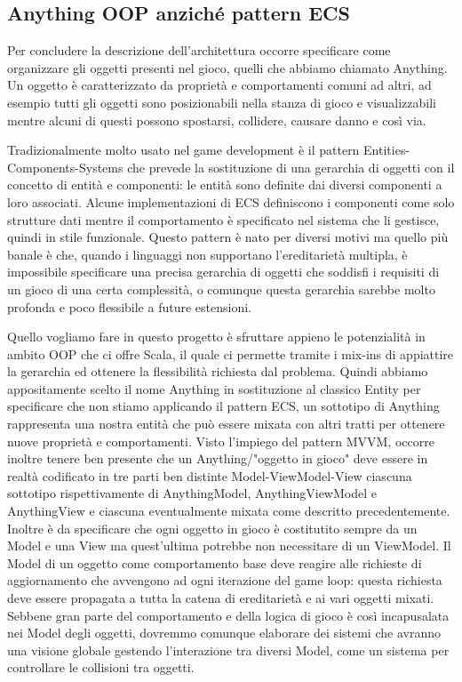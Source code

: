 \subsection{Anything OOP anziché pattern ECS}
Per concludere la descrizione dell'architettura occorre specificare come organizzare gli oggetti presenti nel gioco, quelli che abbiamo chiamato Anything.
Un oggetto è caratterizzato da proprietà e comportamenti comuni ad altri, ad esempio tutti gli oggetti sono posizionabili nella stanza di gioco e visualizzabili mentre alcuni di questi possono spostarsi, collidere, causare danno e così via.

Tradizionalmente molto usato nel game development è il pattern Entities-Components-Systems che prevede la sostituzione di una gerarchia di oggetti con il concetto di entità e componenti: le entità sono definite dai diversi componenti a loro associati. 
Alcune implementazioni di ECS definiscono i componenti come solo strutture dati mentre il comportamento è specificato nel sistema che li gestisce, quindi in stile funzionale. 
Questo pattern è nato per diversi motivi ma quello più banale è che, quando i linguaggi non supportano l'ereditarietà multipla, è impossibile specificare una precisa gerarchia di oggetti che soddisfi i requisiti di un gioco di una certa complessità, o comunque questa gerarchia sarebbe molto profonda e poco flessibile a future estensioni.

Quello vogliamo fare in questo progetto è sfruttare appieno le potenzialità in ambito OOP che ci offre Scala, il quale ci permette tramite i mix-ins di appiattire la gerarchia ed ottenere la flessibilità richiesta dal problema.
Quindi abbiamo appositamente scelto il nome Anything in sostituzione al classico Entity per specificare che non stiamo applicando il pattern ECS, un sottotipo di Anything rappresenta una nostra entità che può essere mixata con altri tratti per ottenere nuove proprietà e comportamenti. 
Visto l'impiego del pattern MVVM, occorre inoltre tenere ben presente che un Anything/"oggetto in gioco" deve essere in realtà codificato in tre parti ben distinte Model-ViewModel-View ciascuna sottotipo rispettivamente di AnythingModel, AnythingViewModel e AnythingView e ciascuna eventualmente mixata come descritto precedentemente. 
Inoltre è da specificare che ogni oggetto in gioco è costitutito sempre da un Model e una View ma quest'ultima potrebbe non necessitare di un ViewModel.
Il Model di un oggetto come comportamento base deve reagire alle richieste di aggiornamento che avvengono ad ogni iterazione del game loop: questa richiesta deve essere propagata a tutta la catena di ereditarietà e ai vari oggetti mixati.
Sebbene gran parte del comportamento e della logica di gioco è così incapusalata nei Model degli oggetti, dovremmo comunque elaborare dei sistemi che avranno una visione globale gestendo l'interazione tra diversi Model, come un sistema per controllare le collisioni tra oggetti.

